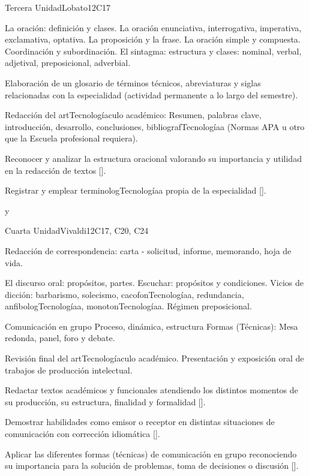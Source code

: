 \begin{syllabus}
\begin{unit}{}{Tercera Unidad}{Lobato}{12}{C17}
\begin{topics}
   \item La oración: definición y clases. La oración enunciativa, interrogativa, imperativa, exclamativa, optativa. La proposición y la frase. La oración simple y compuesta. Coordinación y subordinación. El sintagma: estructura y clases: nominal, verbal, adjetival, preposicional, adverbial.
   \item Elaboración de un glosario de términos técnicos, abreviaturas y siglas relacionadas con la especialidad (actividad permanente a lo largo del semestre).
   \item Redacción del artTecnologíaculo académico: Resumen, palabras clave, introducción, desarrollo, conclusiones, bibliografTecnologíaa (Normas APA u otro que la Escuela profesional requiera).
\end{topics}
\begin{learningoutcomes}
   \item Reconocer y analizar  la estructura oracional valorando su importancia y utilidad en la redacción de textos [\Usage].
   \item Registrar y emplear terminologTecnologíaa propia de la especialidad [\Usage].
\end{learningoutcomes}
\end{unit}
y
\begin{unit}{}{Cuarta Unidad}{Vivaldi}{12}{C17, C20, C24}
\begin{topics}
   \item Redacción de correspondencia: carta - solicitud, informe, memorando, hoja de vida.
   \item El discurso oral: propósitos, partes. Escuchar: propósitos y condiciones. Vicios de dicción: barbarismo, solecismo, cacofonTecnologíaa, redundancia, anfibologTecnologíaa, monotonTecnologíaa. Régimen preposicional.
   \item Comunicación en grupo Proceso, dinámica, estructura Formas (Técnicas): Mesa redonda,  panel, foro y debate.
   \item Revisión final del artTecnologíaculo académico. Presentación y exposición oral de trabajos de producción intelectual.
\end{topics}
\begin{learningoutcomes}
   \item Redactar textos académicos y funcionales atendiendo los distintos momentos de su producción, su estructura, finalidad y formalidad [\Usage].
   \item Demostrar habilidades como emisor o receptor en distintas situaciones de comunicación con corrección idiomática [\Usage].
   \item Aplicar las diferentes formas (técnicas) de comunicación en grupo reconociendo su importancia para la solución de problemas, toma de decisiones o discusión [\Usage].
\end{learningoutcomes}
\end{unit}



\begin{coursebibliography}
\end{coursebibliography}

\end{syllabus}
